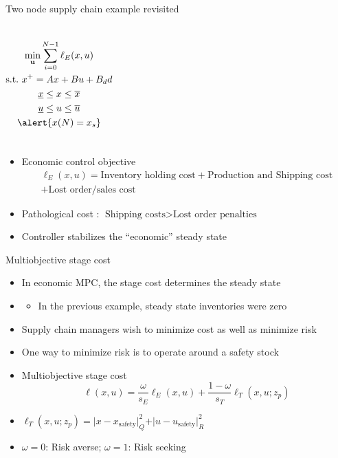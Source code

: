 \documentclass[table]{beamer}
\newcommand\bu {\mathbf{u}}
\newcommand{\norm}[1]{\vert #1 \vert}
\begin{document}
\begin{frame}[t]{Two node supply chain example revisited}
\begin{columns}[T]
{\small{
\begin{gather*}
\min_{\bu} \sum_{i=0}^{N-1} \ell_E(x,u) \\
\text{s.t.~} x^+ = Ax + Bu + B_dd \\
\underline{x} \leq x \leq \overline{x} \\
\underline{u} \leq u \leq \overline{u} \\
\alert{x(N) = x_s} 
\end{gather*}}}
\begin{figure}
   \centering
   \resizebox{1\columnwidth}{!}{}
  \end{figure}
\end{columns}
\begin{itemize} 
\item \alert{Economic control objective}
{{\begin{multline*}\ell_E(x,u) = \text{Inventory holding cost}+ \text{Production and Shipping cost} \\+ \text{Lost order/sales cost} \end{multline*}}}
  \item Pathological cost : $ \text{Shipping costs} > \text{Lost order
      penalties}$ 
  \item \alert{Controller stabilizes the ``economic'' steady state}
 \end{itemize}
\end{frame}

\begin{frame}{Multiobjective stage cost}
\begin{itemize} 
\item In economic MPC, the stage cost \alert{determines the steady state}
\item {\color{blue}{What if the economic steady state is not the
    desired steady state}}
 \begin{itemize}
  \item In the previous example, steady state inventories were zero
 \end{itemize}
\item Supply chain managers wish to \alert{minimize cost} as well as
  \alert{minimize risk}
\item One way to minimize risk is to \alert{operate around a safety
    stock}
\item \alert{Multiobjective stage cost}
{{ \[ \ell(x,u) = \frac{\omega}{s_E}\ell_E(x,u) +
    \frac{1-\omega}{s_T} \ell_T(x,u;z_p) \]}}
\item $\ell_T(x,u;z_p) = \norm{x-x_{\text{safety}}}_Q^2 +
  \norm{u-u_{\text{safety}}}_R^2$
\item $\omega = 0$: Risk averse; $\omega = 1$: Risk seeking
\end{itemize}
\end{frame}
\end{document}
